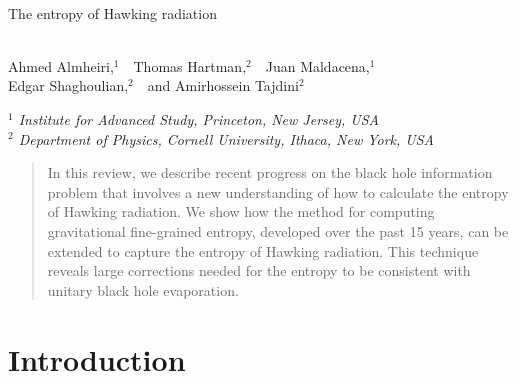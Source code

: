 \documentclass[12pt,oneside]{article}
\numberwithin{equation}{section}
\begin{document}

\begin{center}

~
\vskip5mm

{\LARGE  {
The entropy of Hawking radiation  \\
\ \\
}}

\vskip10mm

Ahmed Almheiri,$^1$\ \ Thomas Hartman,$^{2}$\ \ Juan Maldacena,$^{1}$\\  Edgar Shaghoulian,$^{2}$\ \  and Amirhossein Tajdini$^{2}$

\vskip5mm

{\it $^1$ Institute for Advanced Study, Princeton, New Jersey, USA } \\
\vskip5mm
{\it $^2$ Department of Physics, Cornell University, Ithaca, New York, USA
} 

\vskip5mm

\end{center}

\vspace{4mm}

\begin{abstract}
\noindent
In this review, we describe recent progress on the black hole information problem that involves a new understanding of how to calculate the entropy of Hawking radiation. We show how the method for computing gravitational fine-grained entropy, developed over the past 15 years, can be extended to capture the entropy of Hawking radiation. This technique reveals large corrections needed for the entropy to be consistent with unitary black hole evaporation.



 
 
 \end{abstract}


\pagebreak
\pagestyle{plain}

\setcounter{tocdepth}{2}
{}
\vfill
\tableofcontents

\newpage
    
\section{Introduction}


\end{document}
